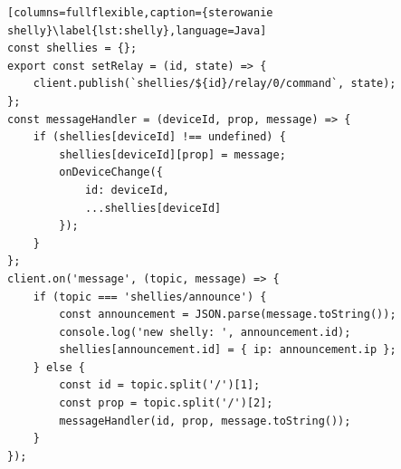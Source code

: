 \newpage
\begin{lstlisting}[columns=fullflexible,caption={sterowanie shelly}\label{lst:shelly},language=Java]
const shellies = {};
export const setRelay = (id, state) => {
	client.publish(`shellies/${id}/relay/0/command`, state);
};
const messageHandler = (deviceId, prop, message) => {
	if (shellies[deviceId] !== undefined) {
		shellies[deviceId][prop] = message;
		onDeviceChange({
			id: deviceId,
			...shellies[deviceId]
		});
	}
};
client.on('message', (topic, message) => {
	if (topic === 'shellies/announce') {
		const announcement = JSON.parse(message.toString());
		console.log('new shelly: ', announcement.id);
		shellies[announcement.id] = { ip: announcement.ip };
	} else {
		const id = topic.split('/')[1];
		const prop = topic.split('/')[2];
		messageHandler(id, prop, message.toString());
	}
});
\end{lstlisting}
